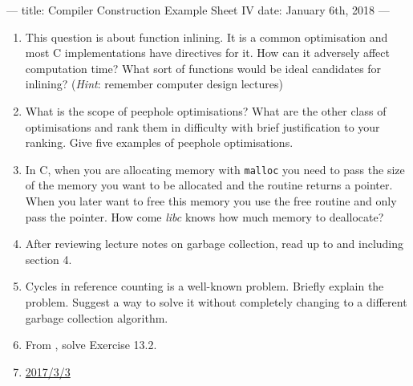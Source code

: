 ---
title: Compiler Construction Example Sheet IV
date: January 6th, 2018
---



\begin{enumerate}
  \item This question is about function inlining. It is a common optimisation
    and most \textsc{C} implementations have directives for it. How can it
    adversely affect computation time? What sort of functions would be ideal
    candidates for inlining? (\emph{Hint}: remember computer design lectures)

  \item What is the scope of peephole optimisations? What are the other class
    of optimisations and rank them in difficulty with brief justification to
    your ranking. Give five examples of peephole optimisations.

  \item In \textsc{C}, when you are allocating memory with \texttt{malloc} you
    need to pass the size of the memory you want to be allocated and the
    routine returns a pointer. When you later want to free this memory you use
    the free routine and only pass the pointer. How come \emph{libc} knows how
    much memory to deallocate?

  \item After reviewing lecture notes on garbage collection, read
    \citet{unified} up to and including section 4.

  \item Cycles in reference counting is a well-known problem. Briefly explain
    the problem. Suggest a way to solve it without completely changing to a
    different garbage collection algorithm.

  \item From \citet[chap. 13]{mogensen}, solve Exercise 13.2.

  \item \href{http://www.cl.cam.ac.uk/teaching/exams/pastpapers/y2017p23q3.pdf}{2017/3/3}

\end{enumerate}


